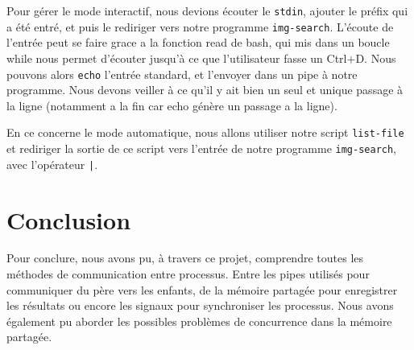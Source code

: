 \documentclass[french]{article}
\begin{document}
Pour gérer le mode interactif, nous devions écouter le \texttt{stdin}, ajouter le préfix qui a été entré, et puis le rediriger vers notre programme \texttt{img-search}. 
L'écoute de l'entrée peut se faire grace a la fonction read de bash, qui mis dans un boucle while nous permet d'écouter jusqu'à ce que l'utilisateur fasse un Ctrl+D. 
Nous pouvons alors \texttt{echo} l'entrée standard, et l'envoyer dans un pipe à notre programme. Nous devons veiller à ce qu'il y ait bien un seul et unique 
passage à la ligne (notamment a la fin car echo génère un passage a la ligne).

En ce concerne le mode automatique, nous allons utiliser notre script \texttt{list-file} et rediriger la sortie de ce script vers l'entrée 
de notre programme \texttt{img-search}, avec l'opérateur \texttt{|}. 

\section{Conclusion}
Pour conclure, nous avons pu, à travers ce projet, comprendre toutes les méthodes de communication entre processus. Entre les pipes utilisés pour communiquer du 
père vers les enfants, de la mémoire partagée pour enregistrer les résultats ou encore les signaux pour synchroniser les processus. Nous avons également pu 
aborder les possibles problèmes de concurrence dans la mémoire partagée.
\end{document}
